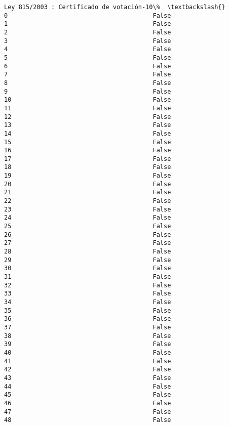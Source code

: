 \documentclass[11pt]{article}
\begin{document}
\begin{Verbatim}[commandchars=\\\{\}]
    Ley 815/2003 : Certificado de votación-10\%  \textbackslash{}
0                                        False   
1                                        False   
2                                        False   
3                                        False   
4                                        False   
5                                        False   
6                                        False   
7                                        False   
8                                        False   
9                                        False   
10                                       False   
11                                       False   
12                                       False   
13                                       False   
14                                       False   
15                                       False   
16                                       False   
17                                       False   
18                                       False   
19                                       False   
20                                       False   
21                                       False   
22                                       False   
23                                       False   
24                                       False   
25                                       False   
26                                       False   
27                                       False   
28                                       False   
29                                       False   
30                                       False   
31                                       False   
32                                       False   
33                                       False   
34                                       False   
35                                       False   
36                                       False   
37                                       False   
38                                       False   
39                                       False   
40                                       False   
41                                       False   
42                                       False   
43                                       False   
44                                       False   
45                                       False   
46                                       False   
47                                       False   
48                                       False   


\end{Verbatim}
\end{document}
